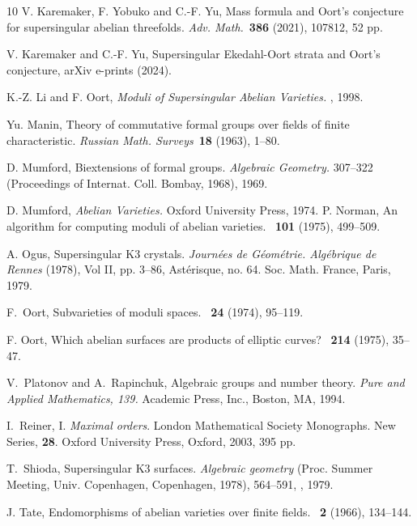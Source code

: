 \documentclass[]{amsart}
\theoremstyle{plain}
\theoremstyle{definition}
\theoremstyle{remark}
\newcommand{\<}{\langle}   %
\renewcommand{\>}{\rangle} %
\begin{document}
\begin{thebibliography}{10}
 V. Karemaker, F. Yobuko and C.-F. Yu, Mass formula
  and Oort's conjecture for supersingular abelian threefolds. 
 {\it Adv. Math.}~{\bf 386} (2021), 107812, 52 pp.

 V. Karemaker and C.-F. Yu, Supersingular Ekedahl-Oort
  strata and Oort's conjecture, arXiv e-prints (2024).




 K.-Z. Li and  F. Oort, 
  {\it Moduli of Supersingular Abelian Varieties.} , 1998.

 Yu. Manin, Theory of commutative formal groups
  over fields of finite characteristic. 
  {\it Russian Math. Surveys}~{\bf 18} (1963), 1--80.


 D. Mumford, Biextensions of formal
  groups. {\it Algebraic Geometry.} 307--322 (Proceedings of
  Internat. Coll. Bombay, 1968), 1969.

 D. Mumford, {\it Abelian Varieties.} Oxford
  University Press, 1974.
 P. Norman, An algorithm for computing moduli of
  abelian varieties. \ann~{\bf 101} (1975), 499--509.
  
 A. Ogus, Supersingular K3 crystals. {\it Journ\'ees
de  G\'eom\'etrie. Alg\'ebrique de Rennes} (1978), Vol
II, pp.  3--86, Ast\'erisque, no.  64. Soc. Math. France, Paris, 1979. 

 F.~Oort, Subvarieties of moduli
  spaces. \invent~{\bf 24} (1974), 95--119.

 F. Oort, Which abelian surfaces 
  are products of elliptic curves? \mathann~{\bf 214} (1975), 35--47.

 V.~Platonov and A.~Rapinchuk,
Algebraic groups and number theory.  
{\it Pure and Applied Mathematics, 139.} 
Academic Press, Inc., Boston, MA, 1994. 

I.~Reiner, I. {\it Maximal orders}. London Mathematical Society
Monographs. New Series, {\bf 28}. Oxford University
Press, Oxford, 2003, 395 pp. 

 T.~Shioda,  Supersingular K3 surfaces. {\it Algebraic
  geometry} (Proc. Summer Meeting, Univ. Copenhagen, Copenhagen, 1978),
  564--591, , 1979.

 J. Tate, Endomorphisms of abelian varieties over
  finite fields. \invent~{\bf 2} (1966), 134--144.


\end{thebibliography}
\end{document}
